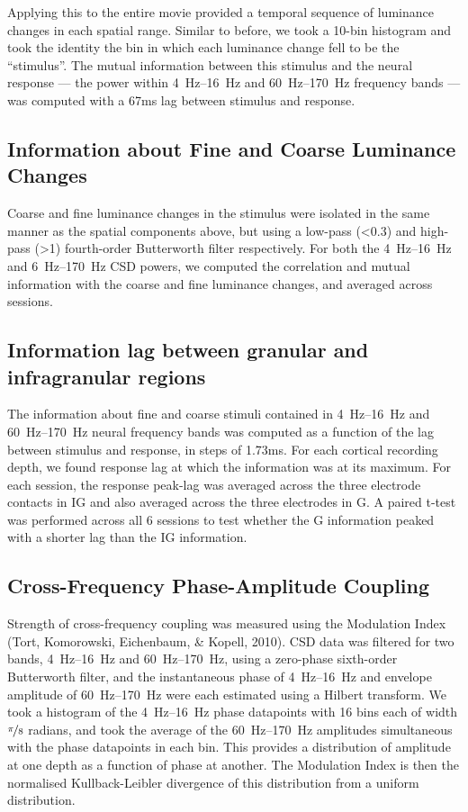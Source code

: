 Applying this to the entire movie provided a temporal sequence of luminance changes in each spatial range.
Similar to before, we took a 10-bin histogram and took the identity the bin in which each luminance change fell to be the ``stimulus''.
The mutual information between this stimulus and the neural response --- the power within \SIrange{4}{16}{Hz} and \SIrange{60}{170}{Hz} frequency bands --- was computed with a 67ms lag between stimulus and response.

\subsection{Information about Fine and Coarse Luminance Changes}
Coarse and fine luminance changes in the stimulus were isolated in the same manner as the spatial components above, but using a low-pass (\SI{<0.3}{\cpd}) and high-pass (\SI{>1}{\cpd}) fourth-order Butterworth filter respectively.
For both the \SIrange{4}{16}{Hz} and \SIrange{6}{170}{Hz} \ac{CSD} powers, we computed the correlation and mutual information with the coarse and fine luminance changes, and averaged across sessions.

\subsection{Information lag between granular and infragranular regions}
The information about fine and coarse stimuli contained in \SIrange{4}{16}{Hz} and \SIrange{60}{170}{Hz} neural frequency bands was computed as a function of the lag between stimulus and response, in steps of 1.73ms.
For each cortical recording depth, we found response lag at which the information was at its maximum.
For each session, the response peak-lag was averaged across the three electrode contacts in \ac{IG} and also averaged across the three electrodes in \ac{G}.
A paired t-test was performed across all 6 sessions to test whether the \ac{G} information peaked with a shorter lag than the \ac{IG} information.

\subsection{Cross-Frequency Phase-Amplitude Coupling}
Strength of cross-frequency coupling was measured using the Modulation Index (Tort, Komorowski, Eichenbaum, \& Kopell, 2010).
\ac{CSD} data was filtered for two bands, \SIrange{4}{16}{Hz} and \SIrange{60}{170}{Hz}, using a zero-phase sixth-order Butterworth filter, and the instantaneous phase of \SIrange{4}{16}{Hz} and envelope amplitude of \SIrange{60}{170}{Hz} were each estimated using a Hilbert transform.
We took a histogram of the \SIrange{4}{16}{Hz} phase datapoints with 16 bins each of width $\nicefrac{\pi}{8}$ radians, and took the average of the \SIrange{60}{170}{Hz} amplitudes simultaneous with the phase datapoints in each bin.
This provides a distribution of amplitude at one depth as a function of phase at another.
The Modulation Index is then the normalised Kullback-Leibler divergence of this distribution from a uniform distribution.

